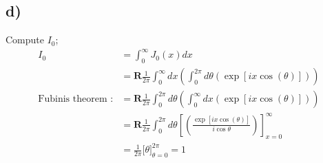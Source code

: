 \documentclass{article}
\begin{document}
\subsection*{d)}
Compute $I_0$;
\begin{align*}
    I_0 &= \int_0^{\infty}J_0(x)dx\\
    &=\mathbf{R}\frac{1}{2\pi}\int_0^\infty dx\left(\int_0^{2\pi} d\theta\left(\exp\left[ix\cos(\theta)\right]\right)\right)\\
    \text{Fubinis theorem :}&=\mathbf{R}\frac{1}{2\pi}\int_0^{2\pi} d\theta\left(\int_0^{\infty} dx\left(\exp\left[ix\cos(\theta)\right]\right)\right)\\
    &= \mathbf{R}\frac{1}{2\pi}\int_0^{2\pi} d\theta\left[\left(\frac{\exp\left[ix\cos(\theta)\right]}{i\cos\theta}\right)\right]_{x = 0}^\infty\\
    &=\frac{1}{2\pi}\Bigg[\theta\Bigg]_{\theta = 0}^{2\pi} = 1
\end{align*}
\end{document}
